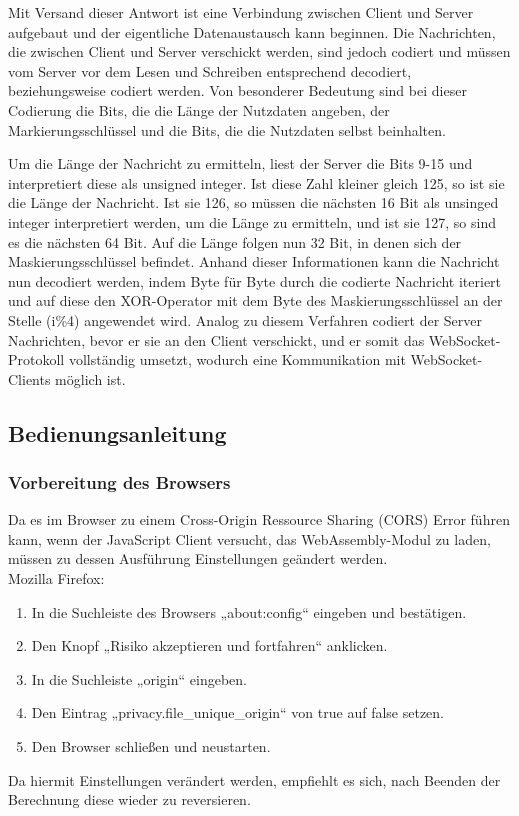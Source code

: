 \documentclass[12pt, onecolumn, notitlepage]{scrartcl}
\begin{document}
Mit Versand dieser Antwort ist eine Verbindung zwischen Client und Server aufgebaut und der eigentliche Datenaustausch kann beginnen. Die Nachrichten, die zwischen Client und Server verschickt werden, sind jedoch codiert und müssen vom Server vor dem Lesen und Schreiben entsprechend decodiert, beziehungsweise codiert werden. Von besonderer Bedeutung sind bei dieser Codierung die Bits, die die Länge der Nutzdaten angeben, der Markierungsschlüssel und die Bits, die die Nutzdaten selbst beinhalten. \par
Um die Länge der Nachricht zu ermitteln, liest der Server die Bits 9-15 und interpretiert diese als unsigned integer. Ist diese Zahl kleiner gleich 125, so ist sie die Länge der Nachricht. Ist sie 126, so müssen die nächsten 16 Bit als unsinged integer interpretiert werden, um die Länge zu ermitteln, und ist sie 127, so sind es die nächsten 64 Bit. Auf die Länge folgen nun 32 Bit, in denen sich der Maskierungsschlüssel befindet. Anhand dieser Informationen kann die Nachricht nun decodiert werden, indem Byte für Byte durch die codierte Nachricht iteriert und auf diese den XOR-Operator mit dem  Byte des Maskierungsschlüssel an der Stelle (i\%4) angewendet wird.  Analog zu diesem Verfahren codiert der Server Nachrichten, bevor er sie an den Client verschickt, und er somit das WebSocket-Protokoll vollständig umsetzt, wodurch eine Kommunikation mit WebSocket-Clients möglich ist.\\

\subsection{Bedienungsanleitung}
\subsubsection{Vorbereitung des Browsers}
Da es im Browser zu einem Cross-Origin Ressource Sharing (CORS) Error führen kann, wenn der JavaScript Client versucht, das WebAssembly-Modul zu laden, müssen zu dessen Ausführung Einstellungen geändert werden. \\
Mozilla Firefox: 
\begin{enumerate}
	\setlength\itemsep{0.07em}
	\item In die Suchleiste des Browsers „about:config“ eingeben und bestätigen.
	\item Den Knopf „Risiko akzeptieren und fortfahren“ anklicken.
	\item In die Suchleiste „origin“ eingeben.
	\item Den Eintrag „privacy.file\_unique\_origin“ von true auf false setzen.
	\item Den Browser schließen und neustarten.
\end{enumerate}
Da hiermit Einstellungen verändert werden, empfiehlt es sich, nach Beenden der Berechnung diese wieder zu reversieren.
\end{document}
